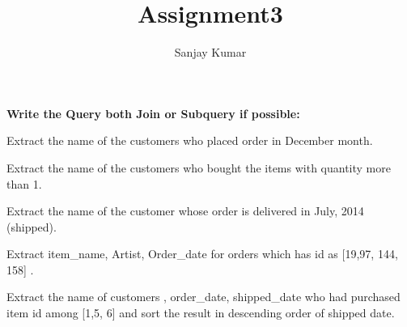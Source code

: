 \documentclass[12pt]{article}
\title{Assignment3}
\author{Sanjay Kumar}
\begin{document}
\maketitle

\textbf{Write the Query both Join or Subquery if possible:}
\enumerate
\item Extract the name of the customers who placed order in December month. 
\item Extract the name of the customers who bought the items with quantity more than 1. 
\item Extract the name of the customer whose order is delivered in July, 2014 (shipped). 
\item Extract item\_name, Artist, Order\_date for orders which has  id as [19,97, 144, 158] .
\item Extract the name of customers , order\_date, shipped\_date who had purchased item 
id among [1,5, 6] and sort the result in descending order of shipped date.   
\enumerate
\end{document}
